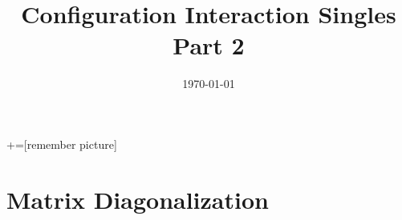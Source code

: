 \documentclass{beamer} %
\author[]{}
\title[CIS]{Configuration Interaction Singles \\
Part 2}
\date[\today]{\today}
\begin{document}

+=[remember picture]

\everymath{\displaystyle}

\frame{\titlepage}

\section{Matrix Diagonalization}
\end{document}
